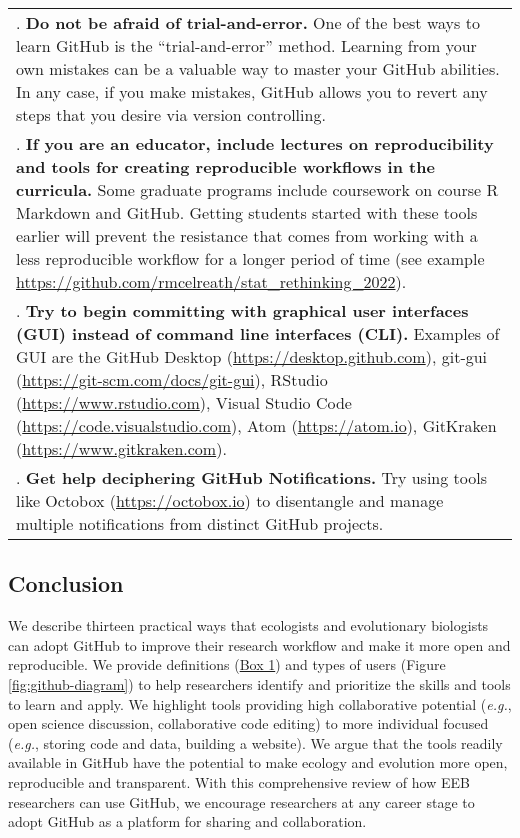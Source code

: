\begin{tablenos:no-prefix-table-caption}
\begin{longtable}[]{@{}
  >{\raggedright\arraybackslash}p{}@{}}
7. \textbf{Do not be afraid of trial-and-error.} One of the best ways to learn GitHub is the ``trial-and-error'' method. Learning from your own mistakes can be a valuable way to master your GitHub abilities. In any case, if you make mistakes, GitHub allows you to revert any steps that you desire via version controlling. \\
8. \textbf{If you are an educator, include lectures on reproducibility and tools for creating reproducible workflows in the curricula.} Some graduate programs include coursework on course R Markdown and GitHub. Getting students started with these tools earlier will prevent the resistance that comes from working with a less reproducible workflow for a longer period of time (see example \url{https://github.com/rmcelreath/stat_rethinking_2022}). \\
9. \textbf{Try to begin committing with graphical user interfaces (GUI) instead of command line interfaces (CLI).} Examples of GUI are the GitHub Desktop (\url{https://desktop.github.com}), git-gui (\url{https://git-scm.com/docs/git-gui}), RStudio (\url{https://www.rstudio.com}), Visual Studio Code (\url{https://code.visualstudio.com}), Atom (\url{https://atom.io}), GitKraken (\url{https://www.gitkraken.com}). \\
10. \textbf{Get help deciphering GitHub Notifications.} Try using tools like Octobox (\url{https://octobox.io}) to disentangle and manage multiple notifications from distinct GitHub projects. \\
\bottomrule
\end{longtable}

\end{tablenos:no-prefix-table-caption}

\hypertarget{conclusion}{%
\subsection{Conclusion}\label{conclusion}}

We describe thirteen practical ways that ecologists and evolutionary biologists can adopt GitHub to improve their research workflow and make it more open and reproducible.
We provide definitions (\protect\hyperlink{definitions}{Box 1}) and types of users (Figure \ref{fig:github-diagram}) to help researchers identify and prioritize the skills and tools to learn and apply.
We highlight tools providing high collaborative potential (\emph{e.g.}, open science discussion, collaborative code editing) to more individual focused (\emph{e.g.}, storing code and data, building a website).
We argue that the tools readily available in GitHub have the potential to make ecology and evolution more open, reproducible and transparent.
With this comprehensive review of how EEB researchers can use GitHub, we encourage researchers at any career stage to adopt GitHub as a platform for sharing and collaboration.

